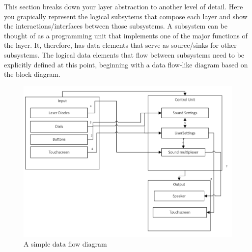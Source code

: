 This section breaks down your layer abstraction to another level of detail. Here you grapically represent the logical subsytems that compose each layer and show the interactions/interfaces between those subsystems. A subsystem can be thought of as a programming unit that implements one of the major functions of the layer. It, therefore, has data elements that serve as source/sinks for other subsystems. The logical data elements that flow between subsystems need to be explicitly defined at this point, beginning with a data flow-like diagram based on the block diagram.

\begin{figure}[h!]
	\centering
 	\includegraphics[width=\textwidth]{images/Subsystem}
 \caption{A simple data flow diagram}
\end{figure}
